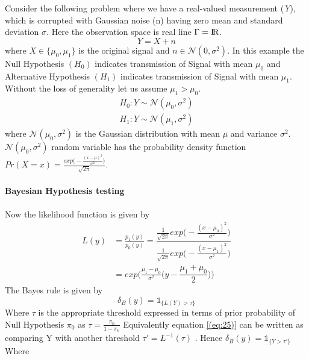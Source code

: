 \documentclass[a4paper,english,12pt]{article}
\begin{document}
\begin{exmp} 
Consider the following problem where we have a real-valued measurement (\textit{Y}), which is corrupted with Gaussian noise (n) having zero mean and standard deviation $\sigma$. Here the observation space is real line $\Gamma=\rm I\!R$.
\begin{equation}
Y=X+n
\end{equation}
where $X\in{\{\mu_{0},\mu_{1}\}}$ is the original signal and $n\in{\mathcal{N}(0,\sigma^{2})}$. In this example the Null Hypothesis $(H_{0})$ indicates transmission of Signal with mean $\mu_{0}$ and Alternative Hypothesis $(H_{1})$ indicates transmission of Signal with mean $\mu_{1}$. Without the loss of generality let us assume $\mu_{1}>\mu_{0}$.
\begin{eqnarray}
{H_0} :Y \sim \mathcal{N} \left( \mu _0, \sigma^2\right) \\
{H_1} :Y \sim \mathcal{N} \left( \mu _1, \sigma^2\right)
\end{eqnarray}
where $\mathcal{N}( \mu _0, \sigma^2)$ is the Gaussian distribution with mean $\mu$ and variance $\sigma^{2}$. $\mathcal{N}(\mu _0, \sigma^2)$ random variable has the probability density function $Pr(X=x)=\frac{exp{\bigl(-\frac{(x-\mu)^{2}}{\sigma^{2}}\bigl)}}{\sqrt{2\pi}}$.
\\\\
\textbf{Bayesian Hypothesis testing}\\\\
 Now the likelihood function is given by 
\begin{align}
L(y)&=\frac{p_{1}(y)}{p_{0}(y)} \nonumber
	=\dfrac{\frac{1}{\sqrt{2\pi}}exp{\bigl(-\frac{(x-\mu_{0})^{2}}{\sigma^{2}}\bigr)}}{\frac{1}{\sqrt{2\pi}}exp{\bigl(-\frac{(x-\mu_{1})^{2}}{\sigma^{2}}\bigr)}}\nonumber\\
	&=exp\biggl(\frac{\mu_{1}-\mu_{0}}{\sigma^{2}}\bigl(y-\dfrac{\mu_{1}+\mu_{0}}{2}\bigr)\biggr)
\end{align}
The Bayes rule is given by 
\begin{equation}
\delta_{B}(y)=\mathds{1}_{\{ L(Y)>\tau\}}
\label{(eq:25)}
\end{equation}
Where $\tau$ is the appropriate threshold expressed in terms of prior probability of Null Hypothesis $\pi_{0}$ as $\tau=\frac{\pi_{0}}{1-\pi_{0}}$
Equivalently equation \ref{(eq:25)} can be written as comparing Y with another threshold $\tau'=L^{-1}(\tau)$ . Hence $\delta_{B}(y)=\mathds{1}_{\{ Y>\tau'\}}$
Where
\begin{equation}

\end{equation}
\end{exmp}
\end{document}
